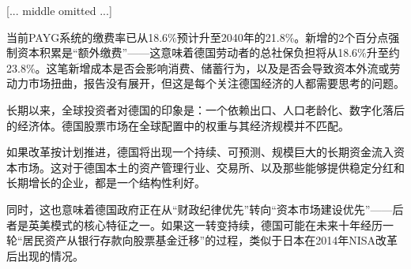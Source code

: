 \documentclass[11pt]{ctexart}
\begin{document}
[... middle omitted ...]

当前PAYG系统的缴费率已从18.6\%预计升至2040年的21.8\%。新增的2个百分点强制资本积累是“额外缴费”——这意味着德国劳动者的总社保负担将从18.6\%升至约23.8\%。这笔新增成本是否会影响消费、储蓄行为，以及是否会导致资本外流或劳动力市场扭曲，报告没有展开，但这是每个关注德国经济的人都需要思考的问题。

长期以来，全球投资者对德国的印象是：一个依赖出口、人口老龄化、数字化落后的经济体。德国股票市场在全球配置中的权重与其经济规模并不匹配。

如果改革按计划推进，德国将出现一个持续、可预测、规模巨大的长期资金流入资本市场。这对于德国本土的资产管理行业、交易所、以及那些能够提供稳定分红和长期增长的企业，都是一个结构性利好。

同时，这也意味着德国政府正在从“财政纪律优先”转向“资本市场建设优先”——后者是英美模式的核心特征之一。如果这一转变持续，德国可能在未来十年经历一轮“居民资产从银行存款向股票基金迁移”的过程，类似于日本在2014年NISA改革后出现的情况。
\end{document}
